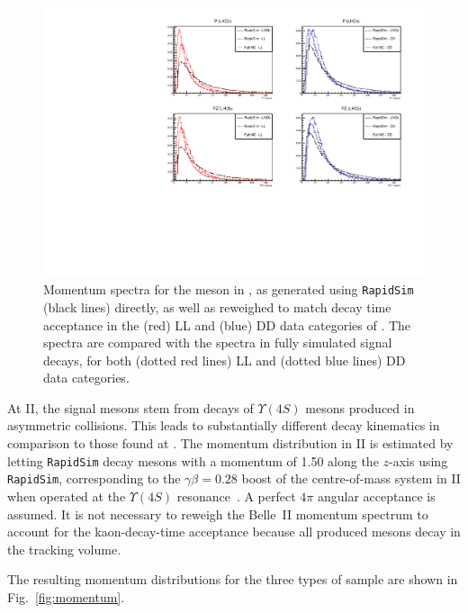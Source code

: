 \begin{figure}[tbp]
    \centering
    \includegraphics[width=0.8\columnwidth]{figures/ks_chapter/note_figs/lhcb_studies/RapidSim_P_comparison.pdf}
    \caption{Momentum spectra for the \KS meson in \lhcb, as generated using \texttt{RapidSim} (black lines) directly, as well as reweighed to match decay time acceptance in the (red) LL and (blue) DD data categories of \lhcb. The \lhcb spectra are compared with the spectra in fully simulated signal decays, for both (dotted red lines) LL and (dotted blue lines) DD data categories.}
    \label{fig:rapidsim_momentum_comparison}
\end{figure}

At \belle II, the signal \B mesons stem from decays of $\Upsilon(4S)$ mesons  produced in asymmetric  collisions. This leads to substantially different decay kinematics in comparison to those found at \lhcb. The momentum distribution in \belle II is estimated by letting \texttt{RapidSim} decay \B mesons with a momentum of 1.50 \gevc along the $z$-axis using \texttt{RapidSim}, corresponding to the $\gamma\beta=0.28$ boost of the centre-of-mass system in \belle II when operated at the $\Upsilon(4S)$ resonance~\cite{kouBelleIIPhysics2019a}. A perfect $4\pi$ angular acceptance is assumed.   It is not necessary to reweigh the Belle~II momentum spectrum to account for the kaon-decay-time acceptance because all produced \KS mesons decay in the tracking volume. 

The resulting momentum distributions for the three types of sample are shown in Fig.~\ref{fig:momentum}.




